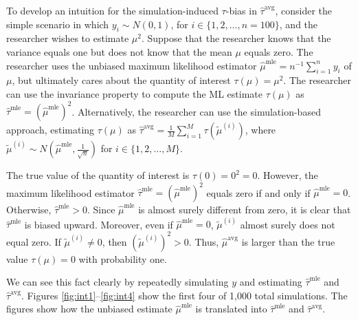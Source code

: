 \documentclass[11pt]{article}
\begin{document}
To develop an intuition for the simulation-induced $\tau$-bias in  $\hat{\tau}^\text{avg}$, consider the simple scenario in which $y_i \sim N(0, 1)$, for $i \in \{1, 2, \ldots, n = 100\}$, and the researcher wishes to estimate $\mu^2$. Suppose that the researcher knows that the variance equals one but does not know that the mean $\mu$ equals zero. The researcher uses the unbiased maximum likelihood estimator $\hat{\mu}^\text{mle} = n^{-1}\sum_{i=1}^n y_i$ of $\mu$, but ultimately cares about the quantity of interest $\tau(\mu) = \mu^2$.
The researcher can use the invariance property to compute the ML estimate $\tau(\mu)$ as $\hat{\tau}^\text{mle} = \left( \hat{\mu}^\text{mle} \right) ^2$.
Alternatively, the researcher can use the simulation-based approach, estimating $\tau(\mu)$ as $\hat{\tau}^\text{avg} = \frac{1}{M} \sum_{i = 1}^M \tau \left( \tilde{\mu}^{(i)} \right)$, where $\tilde{\mu}^{(i)} \sim N \left( \hat{\mu}^\text{mle}, \frac{1}{\sqrt{n}} \right)$ for $i \in \{1, 2,\ldots, M\}$.


The true value of the quantity of interest is $\tau(0) = 0^2 = 0$.
However, the maximum likelihood estimator $\hat{\tau}^\text{mle} = \left( \hat{\mu}^\text{mle} \right)^2$ equals zero if and only if $\hat{\mu}^\text{mle} = 0$.
Otherwise, $\hat{\tau}^\text{mle} > 0$.
Since $\hat{\mu}^\text{mle}$ is almost surely different from zero, it is clear that $\hat{\tau}^\text{mle}$ is biased upward.
Moreover, even if $\hat{\mu}^\text{mle} = 0$, $\tilde{\mu}^{(i)}$ almost surely does not equal zero.
If $\tilde{\mu}^{(i)} \neq 0$, then $\left( \tilde{\mu}^{(i)} \right)^2 > 0$.
Thus, $\hat{\mu}^\text{avg}$ is larger than the true value $\tau(\mu) = 0$ with probability one.


We can see this fact clearly by repeatedly simulating $y$ and estimating $\hat{\tau}^\text{mle}$ and $\hat{\tau}^\text{avg}$.
Figures \ref{fig:int1}--\ref{fig:int4} show the first four of 1,000 total simulations.
The figures show how the unbiased estimate $\hat{\mu}^\text{mle}$ is translated into $\hat{\tau}^\text{mle}$ and $\hat{\tau}^\text{avg}$.
\end{document}
